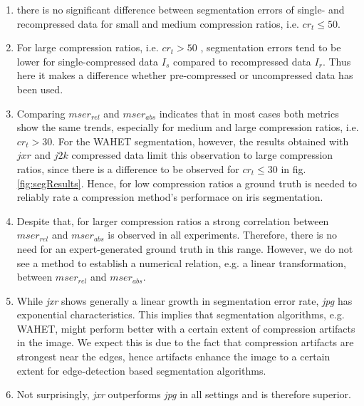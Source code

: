 \documentclass[10pt,twocolumn,letterpaper]{article}
\begin{document}
\begin{enumerate}
 \item there is no significant difference between segmentation errors of single- and recompressed data for small and medium compression ratios, i.e. $ cr_t \leq 50 $.  \label{noDiff}
 \item For large compression ratios, i.e. $cr_t > 50$ , segmentation errors tend to be lower for single-compressed data  $I_s$ compared to recompressed data $I_r$. Thus here it makes a difference whether pre-compressed or uncompressed data has been used. \label{yesDiff} 
 
 \item Comparing $mser_{rel}$ and $mser_{abs}$ indicates that in most cases both metrics show the same trends, especially for medium and large compression ratios, i.e. $cr_t > 30$. For the WAHET segmentation, however, the results obtained with $jxr$ and $j2k$ compressed data limit this observation to large compression ratios, since there is a difference to be observed for $cr_t \leq 30$ in fig. \ref{fig:segResults}. Hence, for low compression ratios a ground truth is needed to reliably rate a compression method's performace on iris segmentation. \label{gtForLow}
 
 \item Despite that, for larger compression ratios a strong correlation between $mser_{rel}$ and $mser_{abs}$ is observed in all experiments. Therefore, there is no need for an expert-generated ground truth in this range. However, we do not see a method to establish a numerical relation, e.g. a linear transformation, between $mser_{rel}$ and $mser_{abs}$. \label{gtNoHigh}
 
 \item While \emph{jxr} shows generally a linear growth in segmentation error rate, \emph{jpg} has exponential characteristics. This implies that segmentation algorithms, e.g. WAHET, might perform better with a certain extent of compression artifacts in the image. We expect this is due to the fact that compression artifacts are strongest near the edges, hence artifacts enhance the image to a certain extent for edge-detection based segmentation algorithms. \label{exponentialGrowth}
 
 
 \item Not surprisingly, \emph{jxr} outperforms \emph{jpg} in all settings and is therefore superior. \label{bestMethods}
\end{enumerate}
\end{document}
